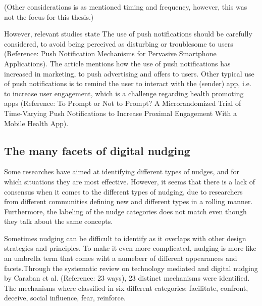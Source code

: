 (Other considerations is as mentioned timing and frequency, however, this was not the focus for this thesis.) 


However, relevant studies state The use of push notifications should be carefully considered, to avoid being perceived as disturbing or troublesome to users (Reference: Push Notification Mechanisms for Pervasive Smartphone Applications). The article mentions how the use of push notifications has increased in marketing, to push advertising and offers to users. Other typical use of push notifications is to remind the user to interact with the (sender) app, i.e. to increase user engagement, which is a challenge regarding health promoting apps (Reference: To Prompt or Not to Prompt? A Microrandomized Trial of Time-Varying Push Notifications to Increase Proximal Engagement With a Mobile Health App).

\subsection{The many facets of digital nudging}
Some researches have aimed at identifying different types of nudges, and for which situations they are most effective. However, it seems that there is a lack of consensus when it comes to the different types of nudging, due to researchers from different communities defining new and different types in a rolling manner. Furthermore, the labeling of the nudge categories does not match even though they talk about the same concepts. 

Sometimes nudging can be difficult to identify as it overlaps with other design strategies and principles. To make it even more complicated, nudging is more like an umbrella term that comes wiht a numeberr of different appearances and facets.Through the systematic review on technology mediated and digital nudging by Caraban et al. (Reference: 23 ways), 23 distinct mechanisms were identified. The mechanisms where classified in six different categories: facilitate, confront, deceive, social influence, fear, reinforce. 

